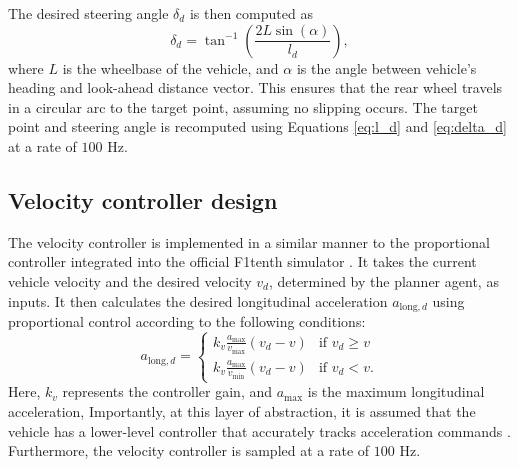 The desired steering angle $\delta_d$ is then computed as
\begin{equation}\label{eq:delta_d}
    \delta_d = \tan^{-1} \left( \frac{2L\sin(\alpha)}{l_d} \right),
\end{equation}
where $L$ is the wheelbase of the vehicle, and $\alpha$ is the angle between vehicle's heading and look-ahead distance vector.
This ensures that the rear wheel travels in a circular arc to the target point, assuming no slipping occurs. 
The target point and steering angle is recomputed using Equations \ref{eq:l_d} and \ref{eq:delta_d} at a rate of $100$ Hz.











\subsection{Velocity controller design}

The velocity controller is implemented in a similar manner to the proportional controller integrated into the official F1tenth simulator \cite{f1tenth}.
It takes the current vehicle velocity and the desired velocity $v_d$, determined by the planner agent, as inputs. 
It then calculates the desired longitudinal acceleration $a_{\text{long},d}$ using proportional control according to the following conditions:
\begin{equation}
    a_{\text{long},d} = 
    \begin{cases}
        k_v \frac{a_{\text{max}}}{v_{\text{max}}}(v_d - v) & \text{if } v_d \geq v\\
        k_v \frac{a_{\text{max}}}{v_{\text{min}}}(v_d - v) & \text{if } v_d < v.
    \end{cases}
\label{eq:vel_control}
\end{equation}
Here, $k_v$ represents the controller gain, and $a_{\text{max}}$ is the maximum longitudinal acceleration,
Importantly, at this layer of abstraction, it is assumed that the vehicle has a lower-level controller that accurately tracks acceleration commands \cite{Betz2021, Rajamani2012}.
Furthermore, the velocity controller is sampled at a rate of $100$ Hz.







